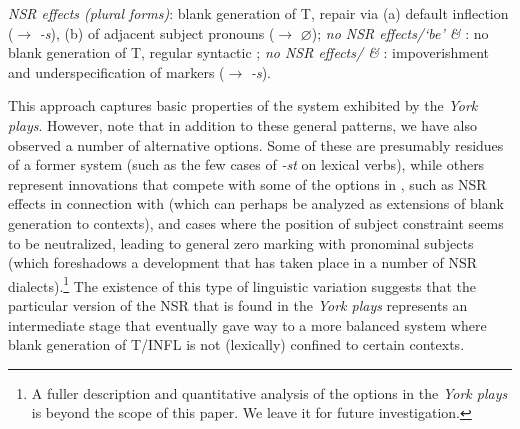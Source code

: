 \documentclass[output=paper]{langsci/langscibook}
\begin{document}
\ea \label{ex:10:29}
\ea \textit{\gls{NSR} effects (plural forms)}: blank generation of T, repair via (a) default inflection ($\rightarrow$ \emph{-s}), (b)  of adjacent subject pronouns ($\rightarrow$ $\varnothing$);
\ex \textit{no \gls{NSR} effects/`be' \& \Fsg{}}: no blank generation of T, regular syntactic ;
\ex \textit{no \gls{NSR} effects/\Ssg{} \& \Tsg{}}:
impoverishment and underspecification of markers
($\rightarrow$ \emph{-s}).
\z
\z

This approach captures basic properties of the  system exhibited by
the \emph{York plays}. However, note that in addition to these general
patterns, we have also observed a number of alternative  options. Some
of these are presumably residues of a former system (such as the few cases of
\Ssg{} \emph{-st} on lexical verbs), while others represent innovations that
compete with some of the options in , such as \gls{NSR} effects in
connection with \Fsg{} (which can perhaps be analyzed as extensions of blank
generation to \Fsg{} contexts), and cases where the position of subject
constraint seems to be neutralized, leading to general zero marking with
pronominal subjects (which foreshadows a development that has taken place in a
number of \gls{NSR} dialects).\footnote{A fuller description and quantitative
    analysis of the  options in the \emph{York plays} is beyond the scope
of this paper. We leave it for future investigation.} The existence of this
type of linguistic variation suggests that the particular version of the
\gls{NSR} that is found in the \emph{York plays} represents an intermediate
stage that eventually gave way to a more balanced  system where blank
generation of T/INFL is not (lexically) confined to certain contexts.

\end{document}
